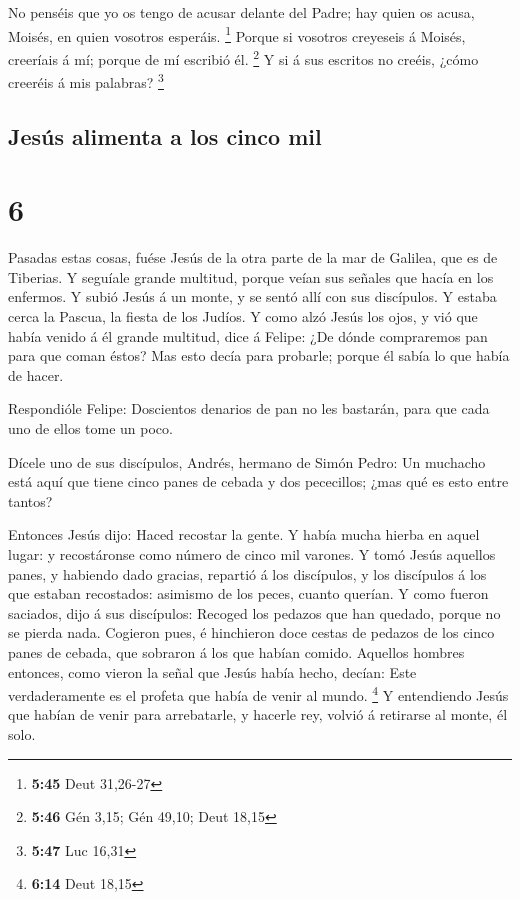  No penséis que yo os tengo de acusar delante del Padre;
hay quien os acusa, Moisés, en quien vosotros esperáis. \footnote{\textbf{5:45}
  Deut 31,26-27}  Porque si vosotros creyeseis á Moisés,
creeríais á mí; porque de mí escribió él. \footnote{\textbf{5:46} Gén
  3,15; Gén 49,10; Deut 18,15}  Y si á sus escritos no
creéis, ¿cómo creeréis á mis palabras? \footnote{\textbf{5:47} Luc 16,31}

\hypertarget{jesuxfas-alimenta-a-los-cinco-mil}{%
\subsection{Jesús alimenta a los cinco
mil}\label{jesuxfas-alimenta-a-los-cinco-mil}}

\hypertarget{section-5}{%
\section{6}\label{section-5}}

 Pasadas estas cosas, fuése Jesús de la otra parte de la mar
de Galilea, que es de Tiberias.  Y seguíale grande multitud,
porque veían sus señales que hacía en los enfermos.  Y subió
Jesús á un monte, y se sentó allí con sus discípulos.  Y
estaba cerca la Pascua, la fiesta de los Judíos.  Y como
alzó Jesús los ojos, y vió que había venido á él grande multitud, dice á
Felipe: ¿De dónde compraremos pan para que coman éstos?  Mas
esto decía para probarle; porque él sabía lo que había de hacer.

 Respondióle Felipe: Doscientos denarios de pan no les
bastarán, para que cada uno de ellos tome un poco.

 Dícele uno de sus discípulos, Andrés, hermano de Simón
Pedro:  Un muchacho está aquí que tiene cinco panes de
cebada y dos pececillos; ¿mas qué es esto entre tantos?

 Entonces Jesús dijo: Haced recostar la gente. Y había
mucha hierba en aquel lugar: y recostáronse como número de cinco mil
varones.  Y tomó Jesús aquellos panes, y habiendo dado
gracias, repartió á los discípulos, y los discípulos á los que estaban
recostados: asimismo de los peces, cuanto querían.  Y como
fueron saciados, dijo á sus discípulos: Recoged los pedazos que han
quedado, porque no se pierda nada.  Cogieron pues, é
hinchieron doce cestas de pedazos de los cinco panes de cebada, que
sobraron á los que habían comido.  Aquellos hombres
entonces, como vieron la señal que Jesús había hecho, decían: Este
verdaderamente es el profeta que había de venir al mundo. \footnote{\textbf{6:14}
  Deut 18,15}  Y entendiendo Jesús que habían de venir para
arrebatarle, y hacerle rey, volvió á retirarse al monte, él solo.


